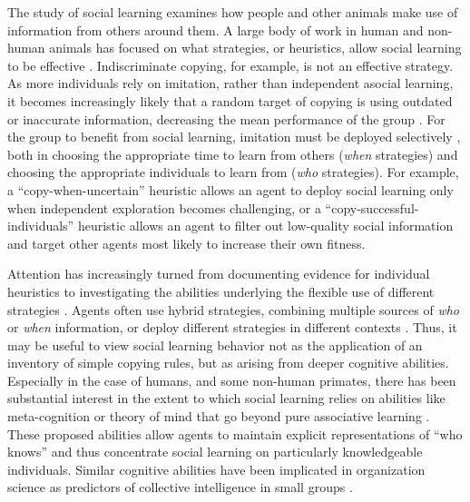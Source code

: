 \documentclass[12pt,letterpaper]{article}
\begin{document}
The study of social learning examines how people and other animals make use of information from others around them.
A large body of work in human and non-human animals has focused on what strategies, or heuristics, allow social learning to be effective \cite{laland_social_2004,hoppitt2013social,RendellFogarty___Laland11_CognitiveCulture,laland2017darwin,toyokawa2019social}. 
Indiscriminate copying, for example, is not an effective strategy. 
As more individuals rely on imitation, rather than independent asocial learning, it becomes increasingly likely that a random target of copying is using outdated or inaccurate information, decreasing the mean performance of the group \cite{rogers_does_1988}.
For the group to benefit from social learning, imitation must be deployed selectively \cite{kameda2003does,boyd1995does,kendal2005trade}, both in choosing the appropriate time to learn from others (\emph{when} strategies) and choosing the appropriate individuals to learn from (\emph{who} strategies). 
For example, a ``copy-when-uncertain'' heuristic allows an agent to deploy social learning only when independent exploration becomes challenging, or a ``copy-successful-individuals'' heuristic allows an agent to filter out low-quality social information and target other agents most likely to increase their own fitness.

Attention has increasingly turned from documenting evidence for individual heuristics to investigating the abilities underlying the flexible use of different strategies \cite{heyes2016blackboxing,kendal2018social}. 
Agents often use hybrid strategies, combining multiple sources of \emph{who} or \emph{when} information, or deploy different strategies in different contexts \cite{mcelreath_beyond_2008}.
Thus, it may be useful to view social learning behavior not as the application of an inventory of simple copying rules, but as arising from deeper cognitive abilities.
Especially in the case of humans, and some non-human primates, there has been substantial interest in the extent to which social learning relies on abilities like meta-cognition \cite{heyes2016knows} or theory of mind \cite{shafto2012learning} that go beyond pure associative learning \cite{behrens2008associative,heyes_whats_2012,heyes2012simple}.
These proposed abilities allow agents to maintain explicit representations of ``who knows'' and thus concentrate social learning on particularly knowledgeable individuals.
Similar cognitive abilities have been implicated in organization science as predictors of collective intelligence in small groups \cite{woolley2010evidence,engel2014reading}.
\end{document}
